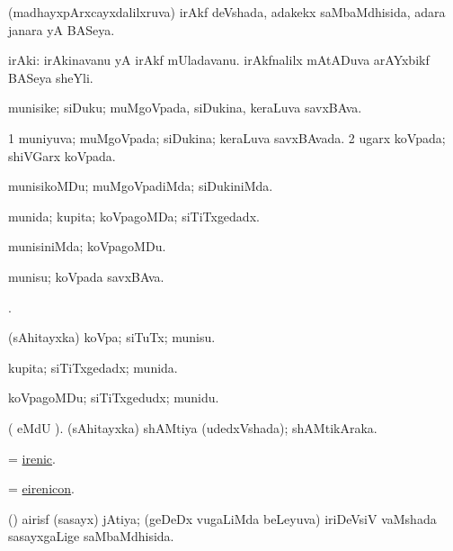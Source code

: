 \bentry
{}
\gl{\gu}
\bmng
(madhayxpArxcayxdalilxruva) irAkf deVshada, adakekx saMbaMdhisida, adara janara yA BASeya. 
\emng
\eentry

\bentry
{}
\gl{\nA}
\bmng
irAki: 
\banum
{} irAkinavanu yA irAkf mUladavanu. 
 irAkfnalilx mAtADuva arAYxbikf BASeya sheYli. 
\eanum
\emng
\eentry

\bentry
{}
\gl{\nA}
\bmng
munisike; siDuku; muMgoVpada, siDukina, keraLuva savxBAva. 
\emng
\eentry

\bentry
{}
\gl{\gu}
\bmng
\bnum
\num{1} muniyuva; muMgoVpada; siDukina; keraLuva savxBAvada. 
\num{2} ugarx koVpada; shiVGarx koVpada. 
\enum
\emng
\eentry

\bentry
{}
\gl{\kirxvi}
\bmng
munisikoMDu; muMgoVpadiMda; siDukiniMda. 
\emng
\eentry

\bentry
{}
\gl{\gu}
\bmng
munida; kupita; koVpagoMDa; siTiTxgedadx. 
\emng
\eentry

\bentry
{}
\gl{\kirxvi}
\bmng
munisiniMda; koVpagoMDu. 
\emng
\eentry

\bentry
{}
\gl{\nA}
\bmng
munisu; koVpada savxBAva. 
\emng
\eentry


\bentry
{}
\gl{\saMkiSx}
\bmng
{}. 
\emng
\eentry

\bentry
{}
\gl{\nA}
\bmng
(sAhitayxka) koVpa; siTuTx; munisu. 
\emng
\eentry

\bentry
{}
\gl{\gu}
\bmng
kupita; siTiTxgedadx; munida. 
\emng
\eentry

\bentry
{}
\gl{\kirxvi}
\bmng
koVpagoMDu; siTiTxgedudx; munidu. 
\emng
\eentry

\bentry
{}
\gl{\gu}
\bmng
( eMdU \parx). (sAhitayxka) shAMtiya (udedxVshada); shAMtikAraka. 
\emng
\eentry

\bentry
{}
\gl{\gu}
\bmng
= \hyperlink{irenic}{irenic}. 
\emng
\eentry

\bentry
{}
\gl{\nA}
\bmng
= \hyperref{kandict_e.pdf}{E}{eirenicon}{eirenicon}. 
\emng
\eentry

\bentry
{}
\gl{\gu}
\bmng
(\savi) airisf (sasayx) jAtiya; (geDeDx \mo vugaLiMda beLeyuva) iriDeVsiV vaMshada sasayxgaLige saMbaMdhisida. 
\emng
\eentry

